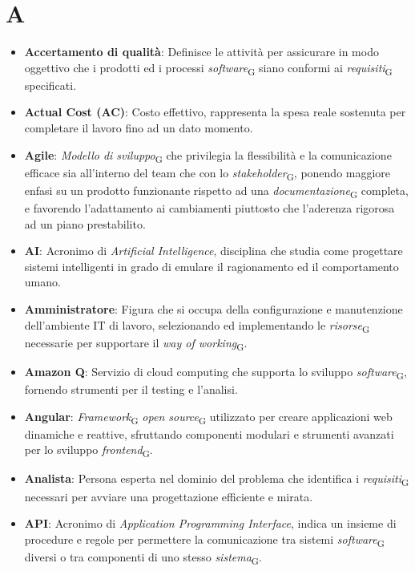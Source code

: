 \section{A}
\begin{itemize}
    \item \textbf{Accertamento di qualità}: Definisce le attività per assicurare in modo oggettivo che i prodotti ed i processi \textit{software}\textsubscript{G} siano conformi ai \textit{requisiti}\textsubscript{G} specificati.
    \item \textbf{Actual Cost (AC)}: Costo effettivo, rappresenta la spesa reale sostenuta per completare il lavoro fino ad un dato momento.
    \item \textbf{Agile}: \textit{Modello di sviluppo}\textsubscript{G} che privilegia la flessibilità e la comunicazione efficace sia all'interno del team che con lo \textit{stakeholder}\textsubscript{G}, ponendo maggiore enfasi su un prodotto funzionante rispetto ad una \textit{documentazione}\textsubscript{G} completa, e favorendo l'adattamento ai cambiamenti piuttosto che l'aderenza rigorosa ad un piano prestabilito.
    \item \textbf{AI}: Acronimo di \textit{Artificial Intelligence}, disciplina che studia come progettare sistemi intelligenti in grado di emulare il ragionamento ed il comportamento umano.
    \item \textbf{Amministratore}: Figura che si occupa della configurazione e manutenzione dell'ambiente IT di lavoro, selezionando ed implementando le \textit{risorse}\textsubscript{G} necessarie per supportare il \textit{way of working}\textsubscript{G}.
    \item \textbf{Amazon Q}: Servizio di cloud computing che supporta lo sviluppo \textit{software}\textsubscript{G}, fornendo strumenti per il testing e l’analisi.
    \item \textbf{Angular}: \textit{Framework}\textsubscript{G} \textit{open source}\textsubscript{G} utilizzato per creare applicazioni web dinamiche e reattive, sfruttando componenti modulari e strumenti avanzati per lo sviluppo \textit{frontend}\textsubscript{G}.
    \item \textbf{Analista}: Persona esperta nel dominio del problema che identifica i \textit{requisiti}\textsubscript{G} necessari per avviare una progettazione efficiente e mirata.
    \item \textbf{API}: Acronimo di \textit{Application Programming Interface}, indica un insieme di procedure e regole per permettere la comunicazione tra sistemi \textit{software}\textsubscript{G} diversi o tra componenti di uno stesso \textit{sistema}\textsubscript{G}.

\end{itemize}

